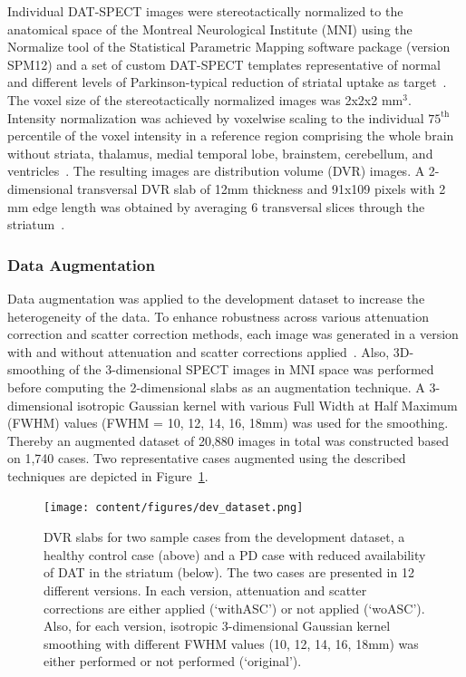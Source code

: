 

Individual DAT-SPECT images were stereotactically normalized to the anatomical space of the Montreal Neurological Institute (MNI) 
using the Normalize tool of the Statistical Parametric Mapping software package (version SPM12) and a set of custom DAT-SPECT templates 
representative of normal and different levels of Parkinson-typical reduction of striatal uptake as target~\citep{Apostolova2023-ec}.
The voxel size of the stereotactically normalized images was 2x2x2 mm$^{3}$. 
Intensity normalization was achieved by voxelwise scaling to the individual $75^{\text{th}}$ percentile of the voxel intensity in a reference region 
comprising the whole brain without striata, thalamus, medial temporal lobe, brainstem, cerebellum, and ventricles~\citep{Kupitz2014-ll}.
The resulting images are distribution volume (DVR) images. 
A 2-dimensional transversal DVR slab of 12mm thickness and 91x109 pixels with 2 mm edge length was obtained 
by averaging 6 transversal slices through the striatum~\citep{Buchert2006-pt}.

\subsubsection{Data Augmentation}
\label{subsec:augment}

Data augmentation was applied to the development dataset to increase the heterogeneity of the data.
To enhance robustness across various attenuation correction and scatter correction methods, 
each image was generated in a version with and without attenuation and scatter corrections applied~\citep{Schiebler2023}.
Also, 3D-smoothing of the 3-dimensional SPECT images in MNI space 
was performed before computing the 2-dimensional slabs as an augmentation technique.
A 3-dimensional isotropic Gaussian kernel with various Full Width at Half Maximum (FWHM) 
values (FWHM = 10, 12, 14, 16, 18mm) was used for the smoothing.
Thereby an augmented dataset of 20,880 images in total was constructed based on 1,740 cases.
Two representative cases augmented using the described techniques are depicted in Figure~\ref{fig:dev_dataset}.

\begin{figure}[t]
    \centering
    \texttt{[image: content/figures/dev\_dataset.png]}
    \caption{DVR slabs for two sample cases from the development dataset, 
    a healthy control case (above) and a PD case with reduced availability of DAT in the striatum (below).
    The two cases are presented in 12 different versions.
    In each version, attenuation and scatter corrections are either applied (`withASC') or not applied (`woASC').
    Also, for each version, isotropic 3-dimensional Gaussian kernel smoothing with different FWHM values (10, 12, 14, 16, 18mm) was 
    either performed or not performed (`original').} 
    \label{fig:dev_dataset}
\end{figure}

